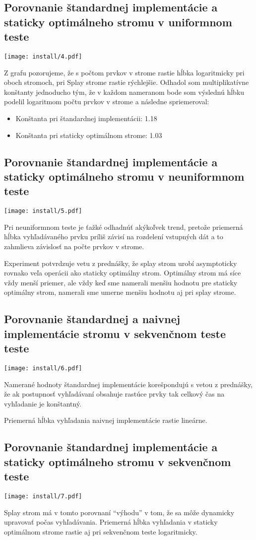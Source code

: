 \documentclass[12pt,a4paper]{article}
\begin{document}
\subsection{Porovnanie štandardnej implementácie a staticky optimálneho stromu v uniformnom teste}
\texttt{[image: install/4.pdf]}

Z grafu pozorujeme, že s počtom prvkov v strome rastie hĺbka logaritmicky pri oboch stromoch, pri Splay strome rastie rýchlejšie. Odhadol som multiplikatívne konštanty jednoducho tým, že v každom nameranom bode som výslednú hĺbku podelil logaritmom počtu prvkov v strome a následne spriemeroval:
\begin{itemize}
	\item Konštanta pri štandardnej implementácii: 1.18
	\item Konštanta pri staticky optimálnom strome: 1.03
\end{itemize}


\subsection{Porovnanie štandardnej implementácie a staticky optimálneho stromu v neuniformnom teste}
\texttt{[image: install/5.pdf]}

Pri neuniformnom teste je ťažké odhadnúť akýkoľvek trend, pretože priemerná hĺbka vyhľadávaného prvku príliš závisí na rozdelení vstupných dát a to zahmlieva závislosť na počte prvkov v strome.

Experiment potvrdzuje vetu z prednášky, že splay strom urobí asymptoticky rovnako veľa operácii ako staticky optimálny strom. Optimálny strom má síce vždy menší priemer, ale vždy keď sme namerali menšiu hodnotu pre staticky optimálny strom, namerali sme umerne menšiu hodnotu aj pri splay strome.

\subsection{Porovnanie štandardnej a naivnej implementácie stromu v sekvenčnom teste teste}

\texttt{[image: install/6.pdf]}

Namerané hodnoty štandardnej implementácie korešpondujú s vetou z prednášky, že ak postupnosť vyhľadávaní obsahuje rastúce prvky tak celkový čas na vyhľadanie je konštantný.

Priemerná hĺbka vyhľadania naivnej implementácie rastie lineárne.

\subsection{Porovnanie štandardnej implementácie a staticky optimálneho stromu v sekvenčnom teste}

\texttt{[image: install/7.pdf]}

Splay strom má v tomto porovnaní ``výhodu'' v tom, že sa môže dynamicky upravovať počas vyhľadávania. Priemerná hĺbka vyhľadania v staticky optimálnom strome rastie aj pri sekvenčnom teste logaritmicky. 
\end{document}
